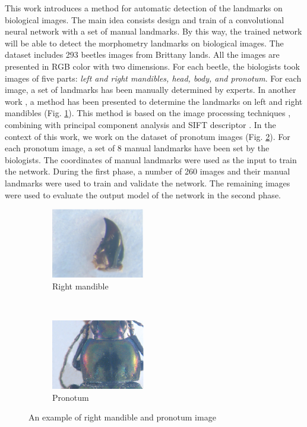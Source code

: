 \documentclass[conference]{IEEEtran}
\begin{document}
This work introduces a method for automatic detection of the landmarks on biological images. The main idea consists design and train of  a convolutional neural network \cite{lecun2010convolutional} with a set of manual landmarks. By this way, the trained network will be able to detect the morphometry landmarks on biological images. The dataset includes 293 beetles images from Brittany lands. All the images are presented in RGB color with two dimensions. For each beetle, the biologists took images of five parts: \textit{left and right mandibles, head, body, and pronotum}. For each image, a set of landmarks has been manually determined by experts. In another work \cite{le2017maelab}, a method has been presented to determine the landmarks on left and right mandibles (Fig. \ref{figsub01}). This method is based on the image processing techniques \cite{canny1986computational}, combining with principal component analysis \cite{shlens2014tutorial} and SIFT descriptor \cite{lowe2004distinctive}. In the context of this work, we work on the dataset of pronotum images (Fig. \ref{figsub02}). For each pronotum image, a set of 8 manual landmarks have been set by the biologists. The coordinates of manual landmarks were used as the input to train the network. During the first phase, a number of 260 images and their manual landmarks were used to train and validate the network. The remaining images were used to evaluate the output model of the network in the second phase.

\begin{figure}[htbp]
    \centering
    \begin{subfigure}[t]{0.25\textwidth}
        \centering
        \includegraphics[height=1.2in]{images/md19.eps}
        \caption{Right mandible}
        \label{figsub01}
    \end{subfigure}%
    ~ 
    \begin{subfigure}[t]{0.25\textwidth}
        \centering
        \includegraphics[height=1.2in]{images/prono60.eps}
        \caption{Pronotum }
        \label{figsub02}
    \end{subfigure}
    \caption{An example of right mandible and pronotum image}
    \label{figsub012}
\end{figure}
\end{document}

